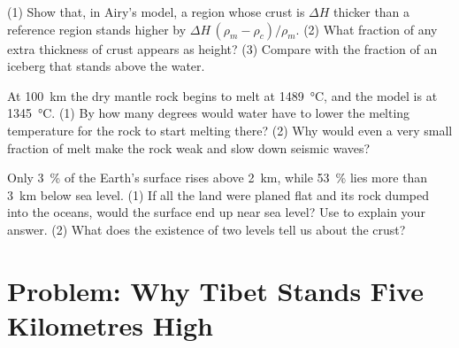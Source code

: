\begin{exercise}[$\star\star\star$]\label{exo:g11:lithosphere-asthenosphere:13}
(1) Show that, in Airy's model, a region whose crust is $\Delta H$ thicker
than a reference region stands higher by $\Delta H\,(\rho_m - \rho_c)/\rho_m$.
(2) What fraction of any extra thickness of crust appears as height? (3)
Compare with the fraction of an iceberg that stands above the water.
\end{exercise}

\begin{exercise}[$\star\star\star$]\label{exo:g11:lithosphere-asthenosphere:14}
At \qty{100}{km} the dry mantle rock begins to melt at \qty{1489}{\celsius},
and the model  is at \qty{1345}{\celsius}. (1) By how many degrees
would water have to lower the melting temperature for the rock to start
melting there? (2) Why would even a very small fraction of melt make the
rock weak and slow down seismic waves?
\end{exercise}

\begin{exercise}[$\star\star\star$]\label{exo:g11:lithosphere-asthenosphere:15}
Only \qty{3}{\percent} of the Earth's surface rises above \qty{2}{km}, while
\qty{53}{\percent} lies more than \qty{3}{km} below sea level. (1) If all the
land were planed flat and its rock dumped into the oceans, would the surface
end up near sea level? Use  to explain your answer. (2) What does
the existence of two levels tell us about the crust?
\end{exercise}

\section{Problem: Why Tibet Stands Five Kilometres High}

